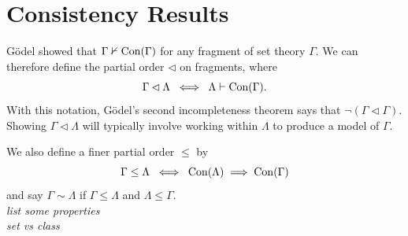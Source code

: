 \documentclass{amsart}
\DeclareMathOperator{\Con}{\rm{Con}}
\begin{document}
	\newpage 
	
	\section{Consistency Results}
	G\"odel showed that $\Gamma\nvdash \Con(\Gamma)$ for any fragment of set theory $\Gamma$. We can therefore define the partial order $\lhd$ on fragments, where 
	$$\Gamma \lhd \Lambda \; \iff \; \Lambda \vdash \Con(\Gamma).$$ 
	With this notation, G\"odel's second incompleteness theorem says that $\neg(\Gamma \lhd \Gamma)$. Showing $\Gamma \lhd \Lambda$ will typically involve working within $\Lambda$ to produce a model of $\Gamma$.
	
	We also define a finer partial order $\leq$ by 
	$$\Gamma\leq \Lambda \; \iff \; \Con(\Lambda)\implies \Con(\Gamma)$$
	and say $\Gamma \sim \Lambda$ if $\Gamma \leq \Lambda$ and $\Lambda \leq \Gamma$.\\
	
	\textit{list some properties}\\
	
	\textit{set vs class}\\
	
\end{document}
